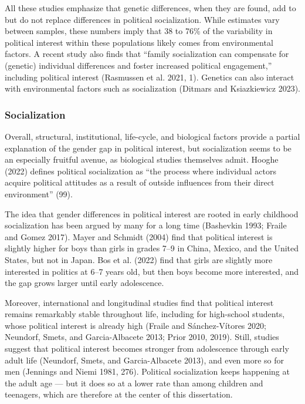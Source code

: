 \documentclass[
  letterpaper,
  DIV=11,
  numbers=noendperiod]{scrreprt}
\begin{document}
All these studies emphasize that genetic differences, when they are
found, add to but do not replace differences in political socialization.
While estimates vary between samples, these numbers imply that 38 to
76\% of the variability in political interest within these populations
likely comes from environmental factors. A recent study also finds that
``family socialization can compensate for (genetic) individual
differences and foster increased political engagement,'' including
political interest (Rasmussen et al. 2021, 1). Genetics can also
interact with environmental factors such as socialization (Ditmars and
Ksiazkiewicz 2023).

\subsubsection{Socialization}\label{socialization}

Overall, structural, institutional, life-cycle, and biological factors
provide a partial explanation of the gender gap in political interest,
but socialization seems to be an especially fruitful avenue, as
biological studies themselves admit. Hooghe (2022) defines political
socialization as ``the process where individual actors acquire political
attitudes as a result of outside influences from their direct
environment'' (99).

The idea that gender differences in political interest are rooted in
early childhood socialization has been argued by many for a long time
(Bashevkin 1993; Fraile and Gomez 2017). Mayer and Schmidt (2004) find
that political interest is slightly higher for boys than girls in grades
7--9 in China, Mexico, and the United States, but not in Japan. Bos et
al. (2022) find that girls are slightly more interested in politics at
6--7 years old, but then boys become more interested, and the gap grows
larger until early adolescence.

Moreover, international and longitudinal studies find that political
interest remains remarkably stable throughout life, including for
high-school students, whose political interest is already high (Fraile
and Sánchez-Vítores 2020; Neundorf, Smets, and Garcia-Albacete 2013;
Prior 2010, 2019). Still, studies suggest that political interest
becomes stronger from adolescence through early adult life (Neundorf,
Smets, and Garcia-Albacete 2013), and even more so for men (Jennings and
Niemi 1981, 276). Political socialization keeps happening at the adult
age --- but it does so at a lower rate than among children and
teenagers, which are therefore at the center of this dissertation.
\end{document}
